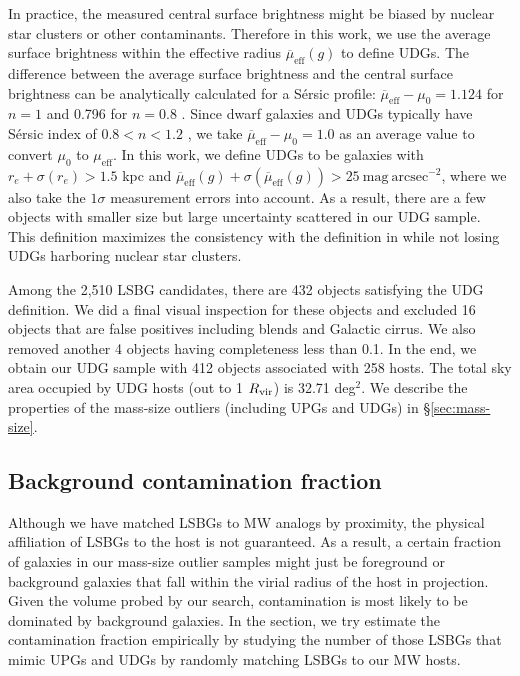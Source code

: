 \documentclass[twocolumn,astrosymb,twocolappendix]{aastex631}
\newcommand{\sbunit}{\mathrm{mag\ arcsec}^{-2}}
\newcommand{\sbeff}{\overline{\mu}_{\mathrm{eff}}(g)}
\newcommand{\sersic}{S\'ersic}
\begin{document}
\begin{CJK*}{UTF8}{gbsn}
In practice, the measured central surface brightness might be biased by nuclear star clusters \citep{Neumayer2020,ELVES-II,Somalwar2020} or other contaminants. Therefore in this work, we use the average surface brightness within the effective radius $\sbeff$ to define UDGs. The difference between the average surface brightness and the central surface brightness can be analytically calculated for a \sersic{} profile: $\overline{\mu}_{\mathrm{eff}} - \mu_0 = 1.124$ for $n=1$ and 0.796 for $n=0.8$ \citep{Graham2005,Yagi2016}. Since dwarf galaxies and UDGs typically have \sersic{} index of $0.8 < n < 1.2$ \citep[e.g.,][]{vanDokkum2015,ELVES-I}, we take $\overline{\mu}_{\mathrm{eff}} - \mu_0 = 1.0$ as an average value to convert $\mu_0$ to $\mu_{\mathrm{eff}}$. In this work, we define UDGs to be galaxies with $r_e+\sigma(r_e) > 1.5$ kpc and $\sbeff + \sigma(\sbeff) > 25\ \sbunit$, where we also take the $1\sigma$ measurement errors into account. As a result, there are a few objects with smaller size but large uncertainty scattered in our UDG sample. This definition maximizes the consistency with the definition in \citet{vanDokkum2015} while not losing UDGs harboring nuclear star clusters.

Among the 2,510 LSBG candidates, there are 432 objects satisfying the UDG definition. We did a final visual inspection for these objects and excluded 16 objects that are false positives including blends and Galactic cirrus. We also removed another 4 objects having completeness less than 0.1. In the end, we obtain our UDG sample with 412 objects associated with 258 hosts. The total sky area occupied by UDG hosts (out to 1 $R_{\rm{vir}}$) is 32.71 deg$^{2}$. We describe the properties of the mass-size outliers (including UPGs and UDGs) in \S\ref{sec:mass-size}.

\subsection{Background contamination fraction}\label{sec:bkg}
Although we have matched LSBGs to MW analogs by proximity, the physical affiliation of LSBGs to the host is not guaranteed. As a result, a certain fraction of galaxies in our mass-size outlier samples might just be foreground or background galaxies that fall within the virial radius of the host in projection. Given the volume probed by our search, contamination is most likely to be dominated by background galaxies. In the section, we try estimate the contamination fraction empirically by studying the number of those LSBGs that mimic UPGs and UDGs by randomly matching LSBGs to our MW hosts.


\end{CJK*}
\end{document}
